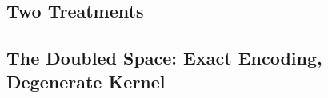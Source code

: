 %

\subsection{Two Treatments}
\label{sec:nonlinear-overview}

\subsection{The Doubled Space: Exact Encoding, Degenerate Kernel}
\label{sec:doubled-space}

